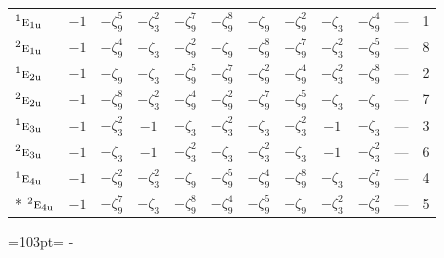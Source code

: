 \documentclass[10pt,a4paper]{article}
\newcommand{\needspace}[1]{\par\penalty-100\begingroup\dimen0=#1\relax\dimen2=\pagegoal
  \advance\dimen2-\pagetotal\ifdim\dimen0>\dimen2\relax\ifdim\dimen2>0pt\vfil\break\fi\fi
  \endgroup}
\numberwithin{equation}{section}
\newcommand{\irr}[1]{\text{\normalfont\scshape #1}}
\newcommand{\conjpair}[1]{{}^{#1}}
\newcommand{\ptag}[1]{\mathrm{#1}}
\newcommand{\rootunity}[1]{\zeta_{#1}}
\begin{document}
{\begin{longtable}{@{}lcccccccccll@{}}
$\conjpair{1}\irr{e}_{1\ptag{u}}$ & $-1$ & $-\rootunity{9}^{5}$ & $-\rootunity{3}^{2}$ & $-\rootunity{9}^{7}$ & $-\rootunity{9}^{8}$ & $-\rootunity{9}$ & $-\rootunity{9}^{2}$ & $-\rootunity{3}$ & $-\rootunity{9}^{4}$ & --- & 1\\
$\conjpair{2}\irr{e}_{1\ptag{u}}$ & $-1$ & $-\rootunity{9}^{4}$ & $-\rootunity{3}$ & $-\rootunity{9}^{2}$ & $-\rootunity{9}$ & $-\rootunity{9}^{8}$ & $-\rootunity{9}^{7}$ & $-\rootunity{3}^{2}$ & $-\rootunity{9}^{5}$ & --- & 8\\
$\conjpair{1}\irr{e}_{2\ptag{u}}$ & $-1$ & $-\rootunity{9}$ & $-\rootunity{3}$ & $-\rootunity{9}^{5}$ & $-\rootunity{9}^{7}$ & $-\rootunity{9}^{2}$ & $-\rootunity{9}^{4}$ & $-\rootunity{3}^{2}$ & $-\rootunity{9}^{8}$ & --- & 2\\
$\conjpair{2}\irr{e}_{2\ptag{u}}$ & $-1$ & $-\rootunity{9}^{8}$ & $-\rootunity{3}^{2}$ & $-\rootunity{9}^{4}$ & $-\rootunity{9}^{2}$ & $-\rootunity{9}^{7}$ & $-\rootunity{9}^{5}$ & $-\rootunity{3}$ & $-\rootunity{9}$ & --- & 7\\
$\conjpair{1}\irr{e}_{3\ptag{u}}$ & $-1$ & $-\rootunity{3}^{2}$ & $-1$ & $-\rootunity{3}$ & $-\rootunity{3}^{2}$ & $-\rootunity{3}$ & $-\rootunity{3}^{2}$ & $-1$ & $-\rootunity{3}$ & --- & 3\\
$\conjpair{2}\irr{e}_{3\ptag{u}}$ & $-1$ & $-\rootunity{3}$ & $-1$ & $-\rootunity{3}^{2}$ & $-\rootunity{3}$ & $-\rootunity{3}^{2}$ & $-\rootunity{3}$ & $-1$ & $-\rootunity{3}^{2}$ & --- & 6\\
$\conjpair{1}\irr{e}_{4\ptag{u}}$ & $-1$ & $-\rootunity{9}^{2}$ & $-\rootunity{3}^{2}$ & $-\rootunity{9}$ & $-\rootunity{9}^{5}$ & $-\rootunity{9}^{4}$ & $-\rootunity{9}^{8}$ & $-\rootunity{3}$ & $-\rootunity{9}^{7}$ & --- & 4\\*
$\conjpair{2}\irr{e}_{4\ptag{u}}$ & $-1$ & $-\rootunity{9}^{7}$ & $-\rootunity{3}$ & $-\rootunity{9}^{8}$ & $-\rootunity{9}^{4}$ & $-\rootunity{9}^{5}$ & $-\rootunity{9}$ & $-\rootunity{3}^{2}$ & $-\rootunity{9}^{2}$ & --- & 5\\
\bottomrule\end{longtable}}
\needspace{103pt}
\end{document}
